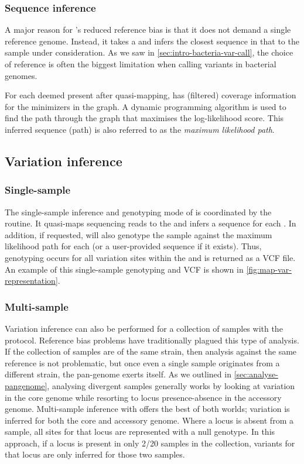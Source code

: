 \subsubsection{Sequence inference}
\label{sec:seq-inference}
A major reason for \pandora{}'s reduced reference bias is that it does not demand a single reference genome. Instead, it takes a \panrg{} and infers the closest sequence in that \panrg{} to the sample under consideration. As we saw in \autoref{sec:intro-bacteria-var-call}, the choice of reference is often the biggest limitation when calling variants in bacterial genomes.

For each \prg{} deemed present after quasi-mapping, \pandora{} has (filtered) coverage information for the minimizers in the \kmer{} graph. A dynamic programming algorithm is used to find the path through the \kmer{} graph that maximises the log-likelihood score. This inferred sequence (path) is also referred to as the \emph{maximum likelihood path}.

\subsection{Variation inference}

\subsubsection{Single-sample}
The single-sample inference and genotyping mode of \pandora{} is coordinated by the \map{} routine. It quasi-maps sequencing reads to the \panrg{} and infers a sequence for each \prg{}. In addition, if requested, \map{} will also genotype the sample against the maximum likelihood path for each \prg{} (or a user-provided sequence if it exists). Thus, genotyping occurs for all variation sites within the \prg{} and is returned as a VCF file. An example of this single-sample genotyping and VCF is shown in \autoref{fig:map-var-representation}.

\subsubsection{Multi-sample}
\label{sec:pandora-compare}
Variation inference can also be performed for a collection of samples with the \compare{} protocol. Reference bias problems have traditionally plagued this type of analysis. If the collection of samples are of the same strain, then analysis against the same reference is not problematic, but once even a single sample originates from a different strain, the pan-genome exerts itself. As we outlined in \autoref{sec:analyse-pangenome}, analysing divergent samples generally works by looking at variation in the core genome while resorting to locus presence-absence in the accessory genome. Multi-sample inference with \compare{} offers the best of both worlds; variation is inferred for both the core and accessory genome. Where a locus is absent from a sample, all sites for that locus are represented with a null genotype. In this approach, if a locus is present in only 2/20 samples in the collection, variants for that locus are only inferred for those two samples.

